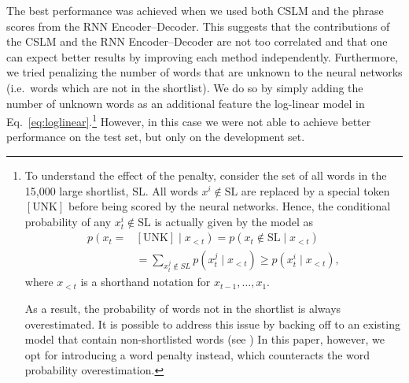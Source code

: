 The best performance was achieved when we used both CSLM and the phrase scores
from the RNN Encoder--Decoder. This suggests that the contributions of the CSLM
and the RNN Encoder--Decoder are not too correlated and that one can expect
better results by improving each method independently.  Furthermore, we tried
penalizing the number of words that are unknown to the neural networks (i.e.\
words which are not in the shortlist). We do so by simply adding the number of
unknown words as an additional feature the log-linear model in
Eq.~\eqref{eq:loglinear}.\footnote{
    To understand the effect of the penalty, consider the set of all words in the
    15,000 large shortlist, $\text{SL}$. All words $x^i \notin \text{SL}$ are
    replaced by a special token $\left[\text{UNK}\right]$ before being scored by
    the neural networks. Hence, the conditional probability of any $x_t^i \notin
    \text{SL}$ is actually given by the model as
    \begin{align*}
        p\left(x_t =\right.&\left. \left[\text{UNK}\right] \mid x_{<t}\right) = p\left(x_t \notin \text{SL} \mid x_{<t}\right) \\
    &= \sum_{x^j_t \notin SL} p\left(x_t^j \mid x_{<t} \right) \geq p\left(x_t^i \mid x_{<t} \right),
    \end{align*}
    where $x_{<t}$ is a shorthand notation for $x_{t-1},\dots,x_1$.

    As a result, the probability of words not in the shortlist is always
    overestimated. It is possible to address this issue by backing off to an
    existing model that contain non-shortlisted words (see
    \mbox{\cite{Schwenk2007}}) In this paper, however, we opt for introducing a
    word penalty instead, which counteracts the word probability overestimation.
}
However, in this case we were not able to achieve better performance on the test
set, but only on the development set.

